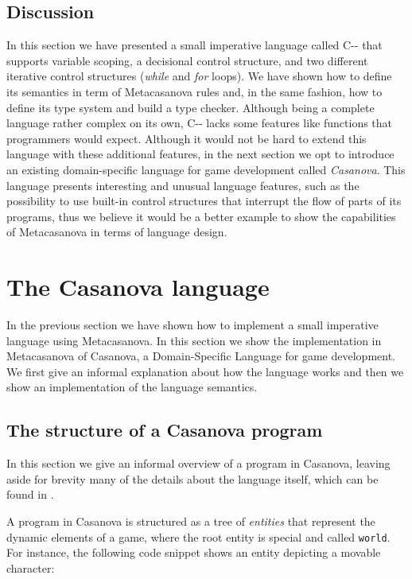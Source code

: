 \subsection{Discussion}
In this section we have presented a small imperative language called C-{}- that supports variable scoping, a decisional control structure, and two different iterative control structures (\textit{while} and \textit{for} loops). We have shown how to define its semantics in term of Metacasanova rules and, in the same fashion, how to define its type system and build a type checker. Although being a complete language rather complex on its own, C-{}- lacks some features like functions that programmers would expect. Although it would not be hard to extend this language with these additional features, in the next section we opt to introduce an existing domain-specific language for game development called \textit{Casanova}. This language presents interesting and unusual language features, such as the possibility to use built-in control structures that interrupt the flow of parts of its programs, thus we believe it would be a better example to show the capabilities of Metacasanova in terms of language design.

\section{The Casanova language}
\label{sec:ch_mcnv_languages_casanova_language}
In the previous section we have shown how to implement a small imperative language using Metacasanova. In this section we show the implementation in Metacasanova of Casanova, a Domain-Specific Language for game development. We first give an informal explanation about how the language works and then we show an implementation of the language semantics.

\subsection{The structure of a Casanova program}
In this section we give an informal overview of a program in Casanova, leaving aside for brevity many of the details about the language itself, which can be found in \cite{abbadi2015casanova, abbadi2015high, abbadi2014resource, abbadithesis2017}.

A program in Casanova is structured as a tree of \textit{entities} that represent the dynamic elements of a game, where the root entity is special and called \texttt{world}. For instance, the following code snippet shows an entity depicting a movable character:

